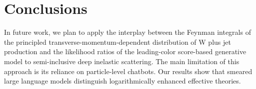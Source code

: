 \section{Conclusions}\label{sec:conclusions}

In future work, we plan to apply the interplay between the Feynman
integrals of the principled transverse-momentum-dependent distribution
of W plus jet production and the likelihood ratios of the leading-color
score-based generative model to semi-inclusive deep inelastic
scattering. The main limitation of this approach is its reliance on
particle-level chatbots. Our results show that smeared large language
models distinguish logarithmically enhanced effective theories.

